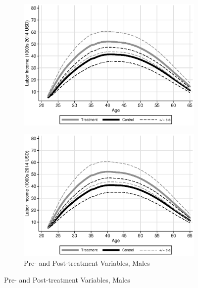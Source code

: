 \begin{figure}
\begin{subfigure}[h]{0.25\textwidth}
		\includegraphics[width=\textwidth]{output/labor_20-65_pset1_mset2_male_sensitivity.eps}
\end{subfigure}%
\begin{subfigure}[h]{0.25\textwidth}
	\centering
	\caption{Pre- and Post-treatment Variables, Males}
		\includegraphics[width=\textwidth]{output/labor_20-65_pset1_mset3_male_sensitivity.eps}
\end{subfigure}
\footnotesize \justify

\end{figure}
